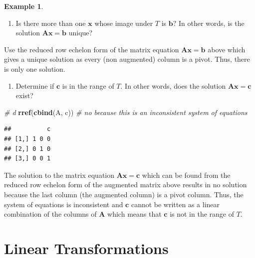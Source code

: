 \documentclass[
]{book}
\newenvironment{Shaded}{\begin{snugshade}}{\end{snugshade}}
\newcommand{\CommentTok}[1]{\textcolor[rgb]{0.56,0.35,0.01}{\textit{#1}}}
\newcommand{\KeywordTok}[1]{\textcolor[rgb]{0.13,0.29,0.53}{\textbf{#1}}}
\newcommand{\NormalTok}[1]{#1}
\providecommand{\tightlist}{%
  \setlength{\itemsep}{0pt}\setlength{\parskip}{0pt}}
\theoremstyle{definition}
\theoremstyle{definition}
\newtheorem{example}{Example}[chapter]
\theoremstyle{definition}
\theoremstyle{definition}
\theoremstyle{remark}
\begin{document}
\begin{example}
\begin{enumerate}
\def\labelenumi{\alph{enumi})}
\setcounter{enumi}{2}
\tightlist
\item
  Is there more than one \(\mathbf{x}\) whose image under \(T\) is \(\mathbf{b}?\) In other words, is the solution \(\mathbf{A} \mathbf{x}= \mathbf{b}\) unique?
\end{enumerate}

Use the reduced row echelon form of the matrix equation \(\mathbf{A} \mathbf{x} = \mathbf{b}\) above which gives a unique solution as every (non augmented) column is a pivot. Thus, there is only one solution.

\begin{enumerate}
\def\labelenumi{\alph{enumi})}
\setcounter{enumi}{3}
\tightlist
\item
  Determine if \(\mathbf{c}\) is in the range of \(T\). In other words, does the solution \(\mathbf{A} \mathbf{x}= \mathbf{c}\) exist?
\end{enumerate}

\begin{Shaded}
\begin{Highlighting}[]
\CommentTok{# d}
\KeywordTok{rref}\NormalTok{(}\KeywordTok{cbind}\NormalTok{(A, c)) }\CommentTok{# no because this is an inconsistent system of equations}
\end{Highlighting}
\end{Shaded}

\begin{verbatim}
##          c
## [1,] 1 0 0
## [2,] 0 1 0
## [3,] 0 0 1
\end{verbatim}

The solution to the matrix equation \(\mathbf{A} \mathbf{x} = \mathbf{c}\) which can be found from the reduced row echelon form of the augmented matrix above results in no solution because the last column (the augmented column) is a pivot column. Thus, the system of equations is inconsistent and \(\mathbf{c}\) cannot be written as a linear combination of the columns of \(\mathbf{A}\) which means that \(\mathbf{c}\) is not in the range of \(T\).
\end{example}

\hypertarget{linear-transformations-1}{%
\section{Linear Transformations}\label{linear-transformations-1}}
\end{document}
